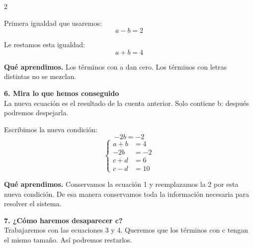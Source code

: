 \documentclass[11pt,a4paper,landscape]{article}
\begin{document}
\begin{multicols*}{2}
\begin{minipage}{\linewidth}
\par{}\par\smallskip
\par\smallskip Primera igualdad que usaremos:
\[a - b = 2\]
\par\smallskip Le restamos esta igualdad:
\[a + b = 4\]
\par\smallskip\textbf{Qué aprendimos.} Los términos con a dan cero. Los términos con letras distintas no se mezclan.
\end{minipage}\par\medskip
\noindent\begin{minipage}{\linewidth}\textbf{6. Mira lo que hemos conseguido}\\[2pt]La nueva ecuación es el resultado de la cuenta anterior. Solo contiene b: después podremos despejarla.
\par\smallskip Escribimos la nueva condición:
\[-2b = -2\]
\[\left\{\begin{aligned}a + b &= 4\\-2b &= -2\\c + d &= 6\\c - d &= 10\end{aligned}\right.\]
\par\smallskip\textbf{Qué aprendimos.} Conservamos la ecuación 1 y reemplazamos la 2 por esta nueva condición. De esa manera conservamos toda la información necesaria para resolver el sistema.
\end{minipage}\par\medskip
\noindent\begin{minipage}{\linewidth}\textbf{7. ¿Cómo haremos desaparecer c?}\\[2pt]Trabajaremos con las ecuaciones 3 y 4. Queremos que los términos con c tengan el mismo tamaño. Así podremos restarlos.

\end{minipage}
\end{multicols*}
\end{document}
